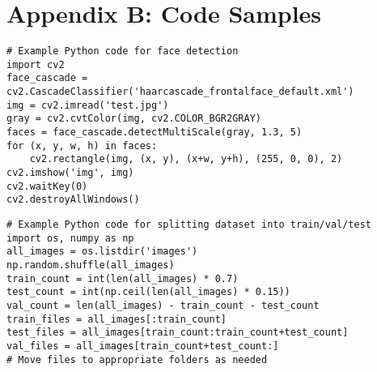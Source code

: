 \section*{Appendix B: Code Samples}

\begin{verbatim}
# Example Python code for face detection
import cv2
face_cascade = cv2.CascadeClassifier('haarcascade_frontalface_default.xml')
img = cv2.imread('test.jpg')
gray = cv2.cvtColor(img, cv2.COLOR_BGR2GRAY)
faces = face_cascade.detectMultiScale(gray, 1.3, 5)
for (x, y, w, h) in faces:
    cv2.rectangle(img, (x, y), (x+w, y+h), (255, 0, 0), 2)
cv2.imshow('img', img)
cv2.waitKey(0)
cv2.destroyAllWindows()
\end{verbatim}

\begin{verbatim}
# Example Python code for splitting dataset into train/val/test
import os, numpy as np
all_images = os.listdir('images')
np.random.shuffle(all_images)
train_count = int(len(all_images) * 0.7)
test_count = int(np.ceil(len(all_images) * 0.15))
val_count = len(all_images) - train_count - test_count
train_files = all_images[:train_count]
test_files = all_images[train_count:train_count+test_count]
val_files = all_images[train_count+test_count:]
# Move files to appropriate folders as needed
\end{verbatim}


